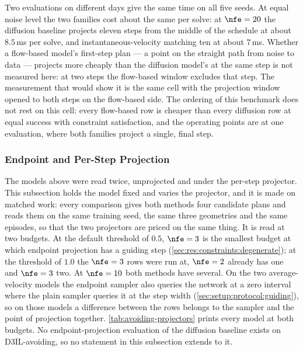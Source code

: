 Two evaluations on different days give the same time on all five seeds. At equal noise level the two
families cost about the same per solve: at $\nfe=20$ the diffusion baseline projects eleven steps from
the middle of the schedule at about $8.5$\,ms per solve, and instantaneous-velocity matching ten at about
$7$\,ms. Whether a flow-based model's first-step plan --- a point on the straight path from noise to
data --- projects more cheaply than the diffusion model's at the same step is not measured here: at two
steps the flow-based window excludes that step. The measurement that would show it is the same cell with
the projection window opened to both steps on the flow-based side.
The ordering of this benchmark does not rest on this cell: every flow-based row is cheaper than
every diffusion row at equal success with constraint satisfaction, and the operating points are at one
evaluation, where both families project a single, final step.

\subsubsection{Endpoint and Per-Step Projection}\label{sec:res:avoiding:projectors}

The models above were read twice, unprojected and under the per-step projector. This subsection holds the
model fixed and varies the projector, and it is made on matched work: every comparison gives both methods
four candidate plans and reads them on the same training seed, the same three geometries and the same
episodes, so that the two projectors are priced on the same thing. It is read at two budgets. At the
default threshold of $0.5$, $\nfe=3$ is the smallest budget at which endpoint projection has a guiding step
(\autoref{sec:res:constraints:degenerate}); at the threshold of $1.0$ the $\nfe=3$ rows were run at, $\nfe=2$
already has one and $\nfe=3$ two. At $\nfe=10$ both methods have several. On the two average-velocity models the endpoint sampler also
queries the network at a zero interval where the plain sampler queries it at the step width
(\autoref{sec:setup:protocol:guiding}), so on those models a difference between the rows belongs to the
sampler and the point of projection together. \autoref{tab:avoiding-projectors} prints every model at both budgets.
No endpoint-projection evaluation of the diffusion baseline exists on D3IL-avoiding, so no
statement in this subsection extends to it.

